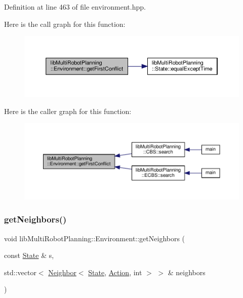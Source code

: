 Definition at line 463 of file environment.\+hpp.

Here is the call graph for this function\+:
\nopagebreak
\begin{figure}[H]
\begin{center}
\leavevmode
\includegraphics[width=350pt]{classlib_multi_robot_planning_1_1_environment_a1d47448bd35c1f46f70c6b7fa37e8146_cgraph}
\end{center}
\end{figure}
Here is the caller graph for this function\+:
\nopagebreak
\begin{figure}[H]
\begin{center}
\leavevmode
\includegraphics[width=350pt]{classlib_multi_robot_planning_1_1_environment_a1d47448bd35c1f46f70c6b7fa37e8146_icgraph}
\end{center}
\end{figure}
\mbox{\label{classlib_multi_robot_planning_1_1_environment_ad0f11d7a4b91ea3d7f7fa39b9ffe9758}} 
\subsubsection{\texorpdfstring{get\+Neighbors()}{getNeighbors()}}
{\footnotesize\ttfamily void lib\+Multi\+Robot\+Planning\+::\+Environment\+::get\+Neighbors (\begin{DoxyParamCaption}\item[{const \hyperlink{structlib_multi_robot_planning_1_1_state}{State} \&}]{s,  }\item[{std\+::vector$<$ \hyperlink{structlib_multi_robot_planning_1_1_neighbor}{Neighbor}$<$ \hyperlink{structlib_multi_robot_planning_1_1_state}{State}, \hyperlink{namespacelib_multi_robot_planning_aba73fb71693f86a324adfa0e41e1053d}{Action}, int $>$ $>$ \&}]{neighbors }\end{DoxyParamCaption})\hspace{0.3cm}{\ttfamily [inline]}}



